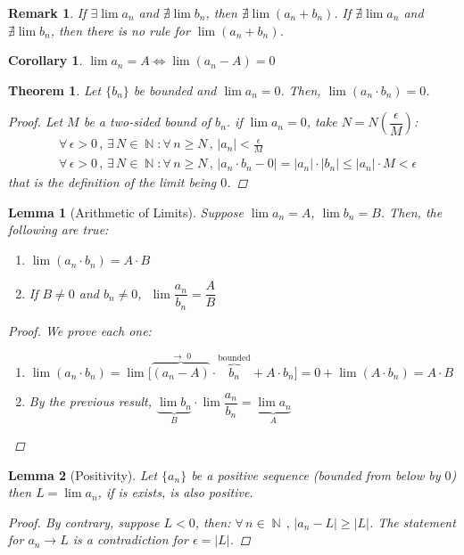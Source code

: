 \documentclass[12pt]{article}
\let\LR\Leftrightarrow
\newcommand{\Forall}[1]{\forall\,{#1}\,,\,}
\newcommand{\Exist}[1]{\exists\,{#1}:}
\DeclareMathOperator{\N}{\mathbb{N}}
\newtheorem{theorem}{Theorem}[subsection]
\newtheorem{lemma}{Lemma}[subsection]
\newtheorem{corollary}{Corollary}[subsection]
\newtheorem{remark}{Remark}[subsection]
\begin{document}
\begin{remark}
  If $\exists\lim a_n$ and $\nexists\lim b_n$, then $\nexists\lim(a_n+b_n)$. If $\nexists\lim a_n$ and $\nexists\lim b_n$, then there is no rule for $\lim(a_n+b_n)$.
\end{remark}

\begin{corollary}
  $\lim a_n=A\LR \lim(a_n-A)=0$
\end{corollary}

\begin{theorem}
  Let $\{b_n\}$ be bounded and $\lim a_n =0$. Then, $\lim(a_n\cdot b_n)=0$.
  \begin{proof}
    Let $M$ be a two-sided bound of $b_n$. if $\lim a_n=0$, take $N=N\left(\dfrac{\epsilon}{M}\right)$:
    \begin{align*}
      &\Forall{\epsilon>0}\Exist{N\in\N}\Forall{n\geq N}|a_n|<\frac{\epsilon}{M}\\
      &\Forall{\epsilon>0}\Exist{N\in\N}\Forall{n\geq N}|a_n\cdot b_n -0|=|a_n|\cdot|b_n|\leq|a_n|\cdot M< \epsilon
    \end{align*}
    that is the definition of the limit being $0$. 
  \end{proof}
\end{theorem}

\begin{lemma}[Arithmetic of Limits]
  Suppose $\lim a_n=A$, $\lim b_n=B$. Then, the following are true:
  \begin{enumerate}
    \item $\lim (a_n\cdot b_n)=A\cdot B$ 
    \item If $B\neq 0$ and $b_n\neq 0$, $\;\lim \dfrac{a_n}{b_n}=\dfrac{A}{B}$ 
  \end{enumerate}
  \begin{proof}
    We prove each one:
    \begin{enumerate}
      \item $\lim (a_n\cdot b_n)=\lim \Big[\overbrace{(a_n-A)}^{\to\;0}\cdot \overbrace{b_n}^\text{bounded}+A\cdot b_n\Big]=0+\lim(A\cdot b_n)=A\cdot B$ 
      \item By the previous result, $\underbrace{\lim b_n}_B\cdot \lim \dfrac{a_n}{b_n}=\underbrace{\lim a_n}_A$ 
    \end{enumerate}
  \end{proof}
\end{lemma}

\begin{lemma}[Positivity]
  Let $\{a_n\}$ be a positive sequence (bounded from below by $0$) then $L=\lim a_n$, if is exists, is also positive.
  \begin{proof}
    By contrary, suppose $L<0$, then: $\Forall{n\in\N}|a_n-L|\geq |L|$. The statement for $a_n\to L$ is a contradiction for $\epsilon=|L|$.
  \end{proof}
\end{lemma}
\end{document}
